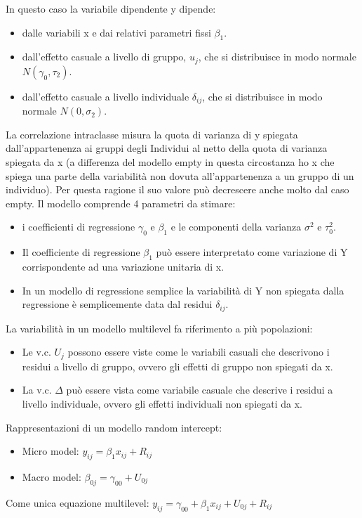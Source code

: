 \documentclass[a4page, 11pt]{article}
\begin{document}
In questo caso la variabile dipendente y dipende:
\begin{itemize}
\item dalle variabili x e dai relativi parametri fissi $\beta_1$.
\item dall’effetto casuale a livello di gruppo, $u_j$, che si distribuisce in modo normale  $N(\gamma_0, \tau_2)$.
\item dall’effetto casuale a livello individuale $\delta_{ij}$, che si distribuisce in modo normale $N(0,\sigma_2)$.
\end{itemize}
La correlazione intraclasse misura la quota di varianza di y spiegata dall’appartenenza ai gruppi degli Individui al netto della quota di varianza spiegata da x (a differenza del modello empty in questa circostanza ho x che spiega una parte della variabilità non dovuta all’appartenenza a un gruppo di un individuo). Per questa ragione il suo valore può decrescere anche molto dal caso empty. Il modello comprende 4 parametri da stimare:
\begin{itemize}
\item i coefficienti di regressione $\gamma_0$ e $\beta_1$ e le componenti della varianza $\sigma^{2}$ e $\tau^{2}_0$.
\item Il coefficiente di regressione $\beta_1$ può essere interpretato come variazione di Y corrispondente ad una variazione unitaria di x.
\item In un modello di regressione semplice la variabilità di Y non spiegata dalla regressione è semplicemente data dal residui $\delta_{ij}$.
\end{itemize}
La variabilità in un modello multilevel fa riferimento a più popolazioni:
\begin{itemize}
\item Le v.c. $U_j$ possono essere viste come le variabili casuali che descrivono i residui a livello di gruppo, ovvero gli effetti di gruppo non spiegati da x.
\item La v.c. $\Delta$ può essere vista come variabile casuale che descrive i residui a livello individuale, ovvero gli effetti individuali non spiegati da x.
\end{itemize}
Rappresentazioni di un modello random intercept:
\begin{itemize}
\item Micro model: $y_{ij}=\beta_1 x_{ij}+R_{ij}$
\item Macro model: $\beta_{0j}=\gamma_{00}+U_{0j}$
\end{itemize}
Come unica equazione multilevel: $y_{ij}=\gamma_{00}+\beta_1 x_{ij}+ U_{0j}+R_{ij}$
\end{document}
